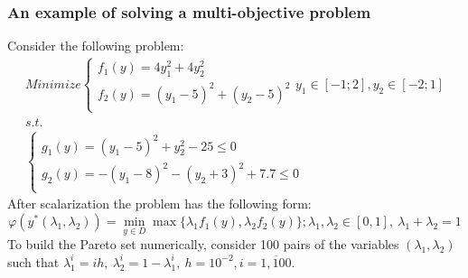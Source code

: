 \documentclass[aspectratio=1610]{beamer}
\begin{document}
\begin{frame}
  \frametitle{An example of solving a multi-objective problem}
  Consider the following problem:
  \begin{displaymath}
    \begin{array}{l}
        Minimize \left \{
        \begin{array}{l}
          f_1(y) = 4 y_1^2 + 4 y_2^2 \\
          f_2(y) = (y_1-5)^2 + (y_2-5)^2 \\
        \end{array}
        \right .
        y_1\in [-1;2],y_2\in [-2;1]
        \\s.t.
        \\
        \left \{
        \begin{array}{l}
          g_1(y) = (y_1 - 5)^2 + y_2^2 - 25 \leqslant 0 \\
          g_2(y) = -(y_1 - 8)^2 - (y_2 + 3)^2 + 7.7 \leqslant 0\\
        \end{array}
        \right .
    \end{array}
  \end{displaymath}
  After scalarization the problem has the following form:
  \begin{displaymath}
    \varphi(y^*(\lambda_1,\lambda_2))=\min_{y\in D}\max\{\lambda_1 f_1(y), \lambda_2 f_2(y)\};\lambda_1,\lambda_2\in[0,1],\: \lambda_1+\lambda_2=1
\end{displaymath}
To build the Pareto set numerically, consider
100 pairs of the variables \((\lambda_1,\lambda_2)\) such that
\(\lambda_1^i=i h,\: \lambda_2^i=1-\lambda_1^i,\: h=10^{-2},i=\overline{1, 100}\).
\end{frame}
\end{document}
